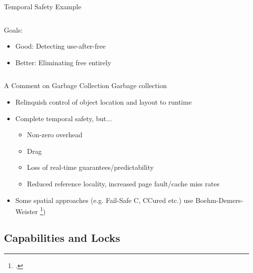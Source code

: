\documentclass[aspectratio=169]{beamer}
\begin{document}
\begin{frame}[fragile]{Temporal Safety Example}
\begin{columns}[T]
\begin{column}{0.44\textwidth}
{\pause

Goals:
\begin{itemize}
    \item Good: Detecting use-after-free
    \item Better: Eliminating free entirely 
\end{itemize}
}
\end{column}
\end{columns}

\end{frame}

\begin{frame}{A Comment on Garbage Collection}
Garbage collection
\pause
    \begin{itemize}[<+->]
        \item Relinquish control of object location and layout to runtime 
        \item Complete temporal safety, but...
        \begin{itemize}
            \item Non-zero overhead
            \item Drag
            \item Loss of real-time guarantees/predictability
            \item Reduced reference locality, increased page fault/cache miss rates
        \end{itemize}
        \item Some spatial approaches (e.g. Fail-Safe C, CCured etc.) use Boehm-Demers-Weister \footcite{boehm_garbage_1988})
    \end{itemize}
\end{frame}

\subsection{Capabilities and Locks}
\end{document}
